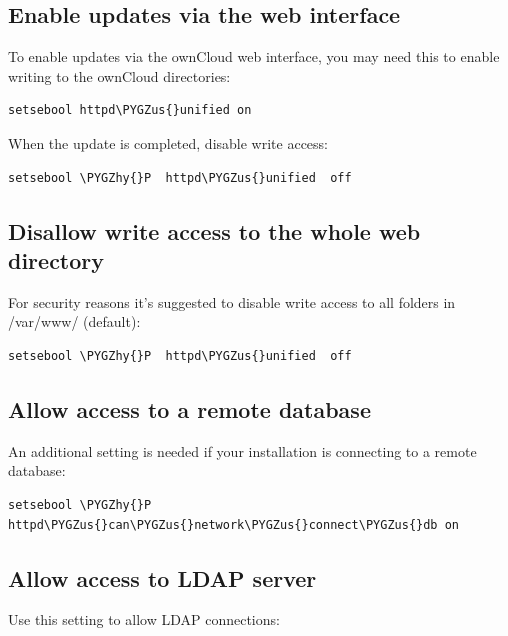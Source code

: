 \documentclass[letterpaper,10pt,english]{sphinxmanual}
\def\PYGZus{\char`\_}
\def\PYGZhy{\char`\-}
\begin{document}
\subsection{Enable updates via the web interface}
\label{installation/selinux_configuration:enable-updates-via-the-web-interface}
To enable updates via the ownCloud web interface, you may need this to enable writing to the ownCloud directories:

\begin{Verbatim}[commandchars=\\\{\}]
setsebool httpd\PYGZus{}unified on
\end{Verbatim}

When the update is completed, disable write access:

\begin{Verbatim}[commandchars=\\\{\}]
setsebool \PYGZhy{}P  httpd\PYGZus{}unified  off
\end{Verbatim}


\subsection{Disallow write access to the whole web directory}
\label{installation/selinux_configuration:disallow-write-access-to-the-whole-web-directory}
For security reasons it's suggested to disable write access to all folders in /var/www/ (default):

\begin{Verbatim}[commandchars=\\\{\}]
setsebool \PYGZhy{}P  httpd\PYGZus{}unified  off
\end{Verbatim}


\subsection{Allow access to a remote database}
\label{installation/selinux_configuration:allow-access-to-a-remote-database}
An additional setting is needed if your installation is connecting to a remote database:

\begin{Verbatim}[commandchars=\\\{\}]
setsebool \PYGZhy{}P httpd\PYGZus{}can\PYGZus{}network\PYGZus{}connect\PYGZus{}db on
\end{Verbatim}


\subsection{Allow access to LDAP server}
\label{installation/selinux_configuration:allow-access-to-ldap-server}
Use this setting to allow LDAP connections:
\end{document}
